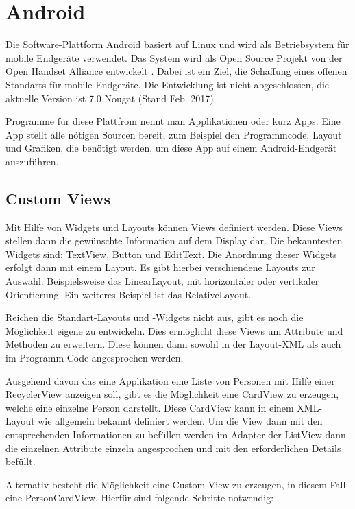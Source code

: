 \section{Android}\label{sec:android}
Die Software-Plattform Android basiert auf Linux und wird als Betriebsystem für mobile Endgeräte verwendet.
Das System wird als Open Source Projekt von der Open Handset Alliance entwickelt \cite{open_handset_alliance}. Dabei ist ein Ziel, die Schaffung eines offenen Standarts für mobile Endgeräte.
Die Entwicklung ist nicht abgeschlossen, die aktuelle Version ist 7.0 Nougat (Stand Feb. 2017).

Programme für diese Plattfrom nennt man Applikationen oder kurz Apps. Eine App stellt alle nötigen Sourcen bereit, zum Beispiel den Programmcode, Layout und Grafiken, die benötigt werden, um diese App auf einem Android-Endgerät auszuführen.

\subsection{Custom Views}
Mit Hilfe von Widgets und Layouts können Views definiert werden. Diese Views stellen dann die gewünschte Information auf dem Display dar. Die bekanntesten Widgets sind: TextView, Button und EditText. Die Anordnung dieser Widgets erfolgt dann mit einem Layout. Es gibt hierbei verschiendene Layouts zur Auswahl. Beispielsweise das LinearLayout, mit horizontaler oder vertikaler Orientierung. Ein weiteres Beispiel ist das RelativeLayout.

Reichen die Standart-Layouts und -Widgets nicht aus, gibt es noch die Möglichkeit eigene zu entwickeln. Dies ermöglicht diese Views um Attribute und Methoden zu erweitern. Diese können dann sowohl in der Layout-XML als auch im Programm-Code angesprochen werden.

Ausgehend davon das eine Applikation eine Liste von Personen mit Hilfe einer RecyclerView anzeigen soll, gibt es die Möglichkeit eine CardView zu erzeugen, welche eine einzelne Person darstellt. Diese CardView kann in einem XML-Layout wie allgemein bekannt definiert werden. Um die View dann mit den entsprechenden Informationen zu befüllen werden im Adapter der ListView dann die einzelnen Attribute einzeln angesprochen und mit den erforderlichen Details befüllt.

Alternativ besteht die Möglichkeit eine Custom-View zu erzeugen, in diesem Fall eine PersonCardView.
Hierfür sind folgende Schritte notwendig:

